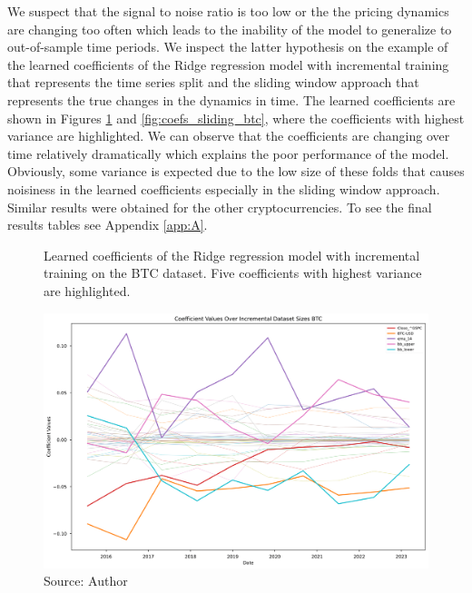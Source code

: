 We suspect that the signal to noise ratio is too low
or the the pricing dynamics are changing too often 
which leads to the inability of the model to generalize
to out-of-sample time periods. We inspect the latter hypothesis
on the example of the learned coefficients of the Ridge regression model
with incremental training that represents
the time series split and the sliding window approach that represents
the true changes in the dynamics in time.
The learned coefficients are shown 
in Figures \ref{fig:coefs_incremental_btc} and \ref{fig:coefs_sliding_btc},
where the coefficients with highest variance are highlighted.
We can observe that the coefficients are changing over time relatively
dramatically which explains the poor performance of the model. Obviously,
some variance is expected due to the low size of these folds
that causes noisiness in the learned coefficients especially in the sliding
window approach. Similar results were obtained for the other cryptocurrencies.
To see the final results tables see Appendix \ref{app:A}.


\begin{figure}[!h]
    \centering
    \caption{Learned coefficients of the Ridge regression model
    with incremental training on the BTC dataset. Five 
    coefficients with highest variance are highlighted.}
    \includegraphics[width=1\textwidth]{Figures/coefficient_values_incremental_btc.png}
    \caption*{Source: Author}
    \label{fig:coefs_incremental_btc}
\end{figure}

